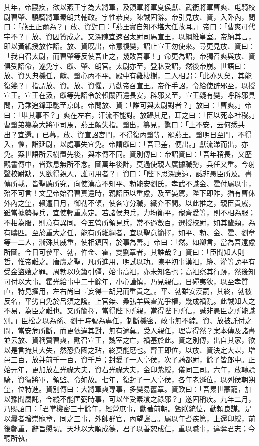 \begin{pinyinscope}
其年，帝寢疾，欲以燕王宇為大將軍，及領軍將軍夏侯獻、武衞將軍曹爽、屯騎校尉曹肇、驍騎將軍秦朗共輔政。宇性恭良，陳誠固辭。帝引見放、資，入卧內，問曰：「燕王正爾為？」放、資對曰：「燕王實自知不堪大任故耳。」帝曰：「曹爽可代宇不？」放、資因贊成之。又深陳宜速召太尉司馬宣王，以綱維皇室。帝納其言，即以黃紙授放作詔。放、資旣出，帝意復變，詔止宣王勿使來。尋更見放、資曰：「我自召太尉，而曹肇等反使吾止之，幾敗吾事！」命更為詔，帝獨召爽與放、資俱受詔命，遂免宇、獻、肇、朗官。太尉亦至，登牀受詔，然後帝崩。世語曰：放、資乆典機任，獻、肇心內不平。殿中有雞棲樹，二人相謂：「此亦乆矣，其能復幾？」指謂放、資。放、資懼，乃勸帝召宣王。帝作手詔，令給使辟邪至，以授宣王。宣王在汲，獻等先詔令於軹關西還長安，辟邪又至，宣王疑有變，呼辟邪具問，乃乘追鋒車馳至京師。帝問放、資：「誰可與太尉對者？」放曰：「曹爽。」帝曰：「堪其事不？」爽在左右，汗流不能對。放躡其足，耳之曰：「臣以死奉社稷。」曹肇弟纂為大將軍司馬，燕王頗失指。肇出，纂見，驚曰：「上不安，云何悉共出？宜還。」已暮，放、資宣詔宮門，不得復內肇等，罷燕王。肇明日至門，不得入，懼，詣延尉，以處事失宜免。帝謂獻曰：「吾已差，便出。」獻流涕而出，亦免。案世語所云樹置先後，與本傳不同。資別傳曰：帝詔資曰：「吾年稍長，又歷觀書傳中，皆歎息無所不念。圖萬年後計，莫過使親人廣據職勢，兵任又重。今射聲校尉缺，乆欲得親人，誰可用者？」資曰：「陛下思深慮遠，誠非愚臣所及。書傳所載，皆聖聽所究，向使漢高不知平、勃能安劉氏，孝武不識金、霍付屬以事，殆不可言！文皇帝始召曹真還時，親詔臣以重慮，及至晏駕，陛下即阼，猶有曹休外內之望，賴遭日月，御勒不傾，使各守分職，纖介不間。以此推之，親臣貴戚，雖當據勢握兵，宜使輕重素定。若諸侯典兵，力均衡平，寵齊愛等，則不相為服；不相為服，則意有異同。今五營所領見兵，常不過數百，選授校尉，如其輩類，為有疇匹。至於重大之任，能有所維綱者，宜以聖意簡擇，如平、勃、金、霍、劉章等一二人，漸殊其威重，使相鎮固，於事為善。」帝曰：「然。如卿言，當為吾遠慮所圖。今日可參平、勃，侔金、霍，雙劉章者，其誰哉？」資曰：「臣聞知人則哲，惟帝難之。唐虞之聖，凡所進用，明試以功。陳平初事漢祖，絳、灌等謗平有受金盜嫂之罪。周勃以吹簫引彊，始事高祖，亦未知名也；高祖察其行跡，然後知可付以大事。霍光給事中二十餘年，小心謹慎，乃見親信。日磾夷狄，以至孝質直，特見擢用，左右尚曰『妄得一胡兒而重貴之』。平、勃雖安漢嗣，其終，勃被反名，平劣自免於呂須之讒。上官桀、桑弘羊與霍光爭權，幾成禍亂。此誠知人之不易，為臣之難也。又所簡擇，當得陛下所親，當得陛下所信，誠非愚臣之所能識別。」臣松之以為孫、劉于時號為專任，制斷機密，政事無不綜。資、放被託付之問，當安危所斷，而更依違其對，無有適莫。受人親任，理豈得然？案本傳及諸書並云放、資稱贊曹爽，勸召宣王，魏室之亡，禍基於此。資之別傳，出自其家，欲以是言掩其大失，然恐負國之玷，終莫能磨也。齊王即位，以放、資決定大謀，增邑三百，放并前千一百，資千戶；封愛子一人亭侯，次子騎都尉，餘子皆郎中。正始元年，更加放左光祿大夫，資右光祿大夫，金印紫綬，儀同三司。六年，放轉驃騎，資衞將軍，領監、令如故。七年，復封子一人亭侯，各年老遜位，以列侯朝朔望，位特進。資別傳曰：大將軍爽專事，多變易舊章。資歎曰：「吾累世蒙寵，加以豫聞屬託，今縱不能匡弼時事，可以坐受素飡之祿邪？」遂固稱疾。九年二月，乃賜詔曰：「君掌機密三十餘年，經營庶事，勳著前朝。曁朕統位，動賴良謀。是以曩者增崇寵章，同之三事，外帥群官，內望讜言。屬以年耆疾篤，上還印綬，前後鄭重，辭旨懇切。天地以大順成德，君子以善恕成仁，重以職事，違奪君志；今聽所執，
\end{pinyinscope}
